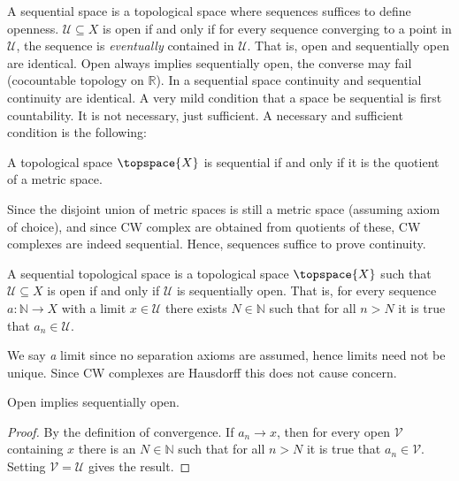 \documentclass{book}                                                           %
\begin{document}
                    A sequential space is a topological space where sequences
                    suffices to define openness. $\mathcal{U}\subseteq{X}$ is
                    open if and only if for every sequence converging to a point
                    in $\mathcal{U}$, the sequence is \textit{eventually}
                    contained in $\mathcal{U}$. That is, open and sequentially
                    open are identical. Open always implies sequentially open,
                    the converse may fail (cocountable topology on
                    $\mathbb{R}$). In a sequential space continuity and
                    sequential continuity are identical. A very mild condition
                    that a space be sequential is first countability. It is not
                    necessary, just sufficient. A necessary and sufficient
                    condition is the following:
                    \begin{theorem}
                        A topological space $\topspace{X}$ is sequential if and
                        only if it is the quotient of a metric space.
                    \end{theorem}
                    Since the disjoint union of metric spaces is still a metric
                    space (assuming axiom of choice), and since CW complex are
                    obtained from quotients of these, CW complexes are indeed
                    sequential. Hence, sequences suffice to prove continuity.
                    \begin{definition}
                        A sequential topological space is a topological space
                        $\topspace{X}$ such that $\mathcal{U}\subseteq{X}$ is
                        open if and only if $\mathcal{U}$ is sequentially open.
                        That is, for every sequence $a:\mathbb{N}\rightarrow{X}$
                        with a limit $x\in\mathcal{U}$ there exists
                        $N\in\mathbb{N}$ such that for all $n>N$ it is true that
                        $a_{n}\in\mathcal{U}$.
                    \end{definition}
                    We say \textit{a} limit since no separation axioms are
                    assumed, hence limits need not be unique. Since CW complexes
                    are Hausdorff this does not cause concern.
                    \begin{theorem}
                        Open implies sequentially open.
                    \end{theorem}
                    \begin{proof}
                        By the definition of convergence. If
                        $a_{n}\rightarrow{x}$, then for every open $\mathcal{V}$
                        containing $x$ there is an $N\in\mathbb{N}$ such that
                        for all $n>N$ it is true that $a_{n}\in\mathcal{V}$.
                        Setting $\mathcal{V}=\mathcal{U}$ gives the result.
                    \end{proof}
\end{document}
